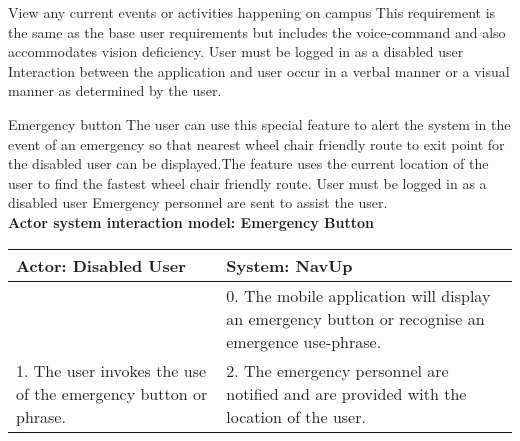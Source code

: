 \FuncReq
{View any current events or activities happening on campus}
{This requirement is the same as the base user requirements but includes the voice-command and also accommodates vision deficiency.}
{User must be logged in as a disabled user}
{Interaction between the application and user occur in a verbal manner or a visual manner as determined by the user.}

\FuncReq
{Emergency button }
{The user can use this special feature to alert the system in the event of an emergency so that nearest wheel chair friendly route to exit point for the disabled user can be displayed.The feature uses the current location of the user to find the fastest wheel chair friendly route.}
{User must be logged in as a disabled user}
{Emergency personnel are sent to assist the user.}
    \\
    \textbf{Actor system interaction model: Emergency Button}\\
    \begin{tabular}{ | p{6cm} | p{6cm} |}
    \hline
    Actor: Disabled User & System: NavUp \\ \hline
     & 0. The mobile application will display an emergency button or recognise an emergence use-phrase.\\ \hline
    1. The user invokes the use of the emergency button or phrase. & 2. The emergency personnel are notified and are provided with the location of the user.\\ \hline   
    \end{tabular}
\\
\bigskip
